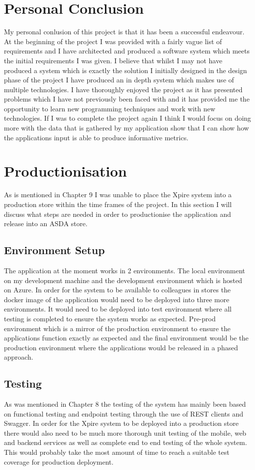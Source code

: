 \documentclass[a4paper,11pt]{report}
\begin{document}
\section{Personal Conclusion}
My personal conlusion of this project is that it has been a successful endeavour. At the beginning of the project I was provided with a fairly vague list of requirements and I have architected and produced a software system which meets the initial requirements I was given. I believe that whilst I may not have produced a system which is exactly the solution I initially designed in the design phase of the project I have produced an in depth system which makes use of multiple technologies. 
I have thoroughly enjoyed the project as it has presented problems which I have not previously been faced with and it has provided me the opportunity to learn new programming techniques and work with new technologies. If I was to complete the project again I think I would focus on doing more with the data that is gathered by my application show that I can show how the applications input is able to produce informative metrics. 
\section{Productionisation}
As is mentioned in Chapter 9 I was unable to place the Xpire system into a production store within the time frames of the project. In this section I will discuss what steps are needed in order to productionise the application and release into an ASDA store. 
\subsection{Environment Setup}
The application at the moment works in 2 environments. The local environment on my development machine and the development environment which is hosted on Azure. In order for the system to be available to colleagues in stores the docker image of the application would need to be deployed into three more environments. It would need to be deployed into test environment where all testing is completed to ensure the system works as expected. Pre-prod environment which is a mirror of the production environment to ensure the applications function exactly as expected and the final environment would be the production environment where the applications would be released in a phased approach. 
\subsection{Testing}
As was mentioned in Chapter 8 the testing of the system has mainly been based on functional testing and endpoint testing through the use of REST clients and Swagger. In order for the Xpire system to be deployed into a production store there would also need to be much more thorough unit testing of the mobile, web and backend services as well as complete end to end testing of the whole system. This would probably take the most amount of time to reach a suitable test coverage for production deployment.
\end{document}
